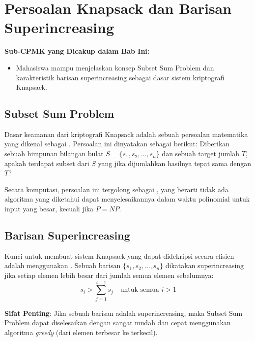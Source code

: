 ﻿%
\section{Persoalan Knapsack dan Barisan Superincreasing}

\vspace{0.5cm}
\noindent\colorbox{blue!10}{\parbox{\dimexpr\textwidth-2\fboxsep}{\textbf{\large Sub-CPMK yang Dicakup dalam Bab Ini:}}}
\vspace{0.3cm}
\begin{itemize}[leftmargin=*, itemsep=5pt]
  \item Mahasiswa mampu menjelaskan konsep Subset Sum Problem dan karakteristik barisan superincreasing sebagai dasar sistem kriptografi Knapsack.
\end{itemize}
\vspace{0.5cm}

\subsection{Subset Sum Problem}
Dasar keamanan dari kriptografi Knapsack adalah sebuah persoalan matematika yang dikenal sebagai . Persoalan ini dinyatakan sebagai berikut:
Diberikan sebuah himpunan bilangan bulat $S = \{s_1, s_2, \dots, s_n\}$ dan sebuah target jumlah $T$, apakah terdapat subset dari $S$ yang jika dijumlahkan hasilnya tepat sama dengan $T$?

Secara komputasi, persoalan ini tergolong sebagai , yang berarti tidak ada algoritma yang diketahui dapat menyelesaikannya dalam waktu polinomial untuk input yang besar, kecuali jika $P=NP$.

\subsection{Barisan Superincreasing}
Kunci untuk membuat sistem Knapsack yang dapat didekripsi secara efisien adalah menggunakan . Sebuah barisan $\{s_1, s_2, \dots, s_n\}$ dikatakan superincreasing jika setiap elemen lebih besar dari jumlah semua elemen sebelumnya:
\[ s_i > \sum_{j=1}^{i-1} s_j \quad \text{untuk semua } i > 1 \]

\textbf{Sifat Penting}: Jika sebuah barisan adalah superincreasing, maka Subset Sum Problem dapat diselesaikan dengan sangat mudah dan cepat menggunakan algoritma \textit{greedy} (dari elemen terbesar ke terkecil).

